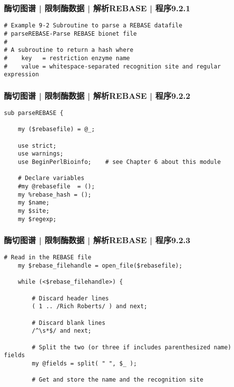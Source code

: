 \begin{frame}[fragile]
  \frametitle{酶切图谱 | 限制酶数据 | 解析REBASE | 程序9.2.1}
  \vspace{-1.5em}
\begin{lstlisting}[firstnumber=1]
# Example 9-2 Subroutine to parse a REBASE datafile
# parseREBASE-Parse REBASE bionet file
#
# A subroutine to return a hash where
#    key   = restriction enzyme name
#    value = whitespace-separated recognition site and regular expression
\end{lstlisting}
\end{frame}

\begin{frame}[fragile]
  \frametitle{酶切图谱 | 限制酶数据 | 解析REBASE | 程序9.2.2}
  \vspace{-1.5em}
\begin{lstlisting}[firstnumber=8]
sub parseREBASE {

    my ($rebasefile) = @_;

    use strict;
    use warnings;
    use BeginPerlBioinfo;    # see Chapter 6 about this module

    # Declare variables
    #my @rebasefile  = ();
    my %rebase_hash = ();
    my $name;
    my $site;
    my $regexp;
\end{lstlisting}
\end{frame}

\begin{frame}[fragile]
  \frametitle{酶切图谱 | 限制酶数据 | 解析REBASE | 程序9.2.3}
  \vspace{-1.5em}
\begin{lstlisting}[firstnumber=23,basicstyle=\small\tt,numberstyle=\footnotesize]
    # Read in the REBASE file
    my $rebase_filehandle = open_file($rebasefile);

    while (<$rebase_filehandle>) {

        # Discard header lines
        ( 1 .. /Rich Roberts/ ) and next;

        # Discard blank lines
        /^\s*$/ and next;

        # Split the two (or three if includes parenthesized name) fields
        my @fields = split( " ", $_ );

        # Get and store the name and the recognition site
\end{lstlisting}
\end{frame}

